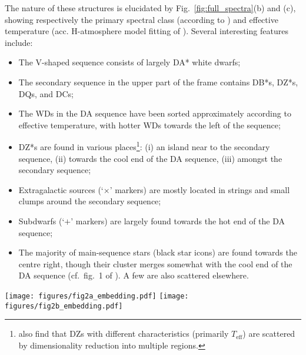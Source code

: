 \documentclass[fleqn,usenatbib]{mnras}
\def\Teff{T_\mathrm{eff}}
\begin{document}
The nature of these structures is elucidated by Fig.~\ref{fig:full_spectra}(b) and (c), showing respectively the primary spectral class (according to \citealt{manser24}) and effective temperature (acc. H-atmosphere model fitting of \citealt{gentilefusillo19}).
Several interesting features include:
\begin{itemize}
\item
The V-shaped sequence consists of largely DA* white dwarfs;
\item
The secondary sequence in the upper part of the frame contains DB*s, DZ*s, DQs, and DCs;
\item
The WDs in the DA sequence have been sorted approximately according to effective temperature, with hotter WDs towards the left of the sequence;
\item
DZ*s are found in various places\footnote{
    \citet{kao24} also find that DZs with different characteristics (primarily $\Teff$) are scattered by dimensionality reduction into multiple regions.
}: (i) an island near to the secondary sequence, (ii) towards the cool end of the DA sequence, (iii) amongst the secondary sequence;
\item
Extragalactic sources (`$\times$' markers) are mostly located in strings and small clumps around the secondary sequence;
\item 
Subdwarfs (`$+$' markers) are largely found towards the hot end of the DA sequence;
\item
The majority of main-sequence stars (black star icons) are found towards the centre right, though their cluster merges somewhat with the cool end of the DA sequence (cf.\ fig.~1 of \citealt{eisenstein06}).
A few are also scattered elsewhere.
\end{itemize}

\begin{figure*}
    \centering
\texttt{[image: figures/fig2a\_embedding.pdf]}
\texttt{[image: figures/fig2b\_embedding.pdf]}
\caption{
    (a) $t$SNE embedding of DESI EDR spectra.
    The dimension-reduced embedding aims to reflect the pairwise distances between the high-dimensional spectra in a two-dimensional space; as such the axes are arbitrary.
    (b) The embedding is colour-coded according to the visual spectral classification of \citet{manser24}.
    For WDs, the colour corresponds to primary spectral type: DA*s (inc.\ DAZs, etc.) in red; DB*s in blue, and so on.
    Other sources not corresponding to individual WDs have different symbols (see key).
    The main feature of the embedding is the sequence of DA*s (red), though several other clusters are clear (see text).
    (c) The embedding is colour-coded by effective temperature, according to the hydrogen-atmosphere WD model which best fits the sources' Gaia photometry \citep{gentilefusillo19}.
    The DA sequence extends from hotter WDs on the left around to cooler WDs at the top right.
    Note that objects with a low probability of being a WD ($P_\mathrm{WD} < 0.75$; see \citealt{gentilefusillo15}) are not assigned a temperature \citep{gentilefusillo19}.
}
\label{fig:full_spectra}
\end{figure*}
\end{document}
